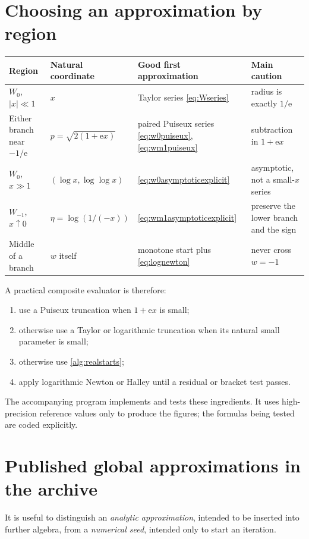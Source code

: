 \documentclass[11pt,oneside]{book}
\theoremstyle{definition}
\theoremstyle{remark}
\newcommand{\ee}{\mathrm e}
\begin{document}
\section{Choosing an approximation by region}

\begin{center}
\begin{tabular}{@{}p{}p{}p{}p{}@{}}
\toprule
Region & Natural coordinate & Good first approximation & Main caution\\
\midrule
$W_0$, $|x|\ll1$ & $x$ & Taylor series
\eqref{eq:Wseries} & radius is exactly $1/\ee$\\
Either branch near $-1/\ee$ & $p=\sqrt{2(1+\ee x)}$ & paired Puiseux series
\eqref{eq:w0puiseux}, \eqref{eq:wm1puiseux} & subtraction in $1+\ee x$\\
$W_0$, $x\gg1$ & $(\log x,\log\log x)$ &
\eqref{eq:w0asymptoticexplicit} & asymptotic, not a small-$x$ series\\
$W_{-1}$, $x\uparrow0$ &
$\eta=\log(1/(-x))$ & \eqref{eq:wm1asymptoticexplicit} & preserve the lower
branch and the sign\\
Middle of a branch & $w$ itself & monotone start plus
\eqref{eq:lognewton} & never cross $w=-1$\\
\bottomrule
\end{tabular}
\end{center}

A practical composite evaluator is therefore:
\begin{enumerate}
\item use a Puiseux truncation when $1+\ee x$ is small;
\item otherwise use a Taylor or logarithmic truncation when its natural
small parameter is small;
\item otherwise use \cref{alg:realstarts};
\item apply logarithmic Newton or Halley until a residual or bracket test
passes.
\end{enumerate}
The accompanying program implements and tests these ingredients.  It uses
high-precision reference values only to produce the figures; the formulas
being tested are coded explicitly.

\section{Published global approximations in the archive}

It is useful to distinguish an \emph{analytic approximation}, intended to be
inserted into further algebra, from a \emph{numerical seed}, intended only to
start an iteration.
\end{document}
